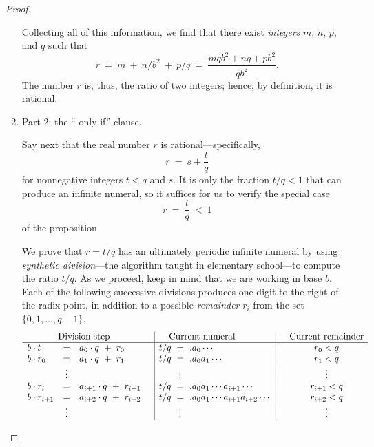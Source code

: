 \begin{proof}
\begin{enumerate}
Collecting all of this information, we find that there exist {\em
  integers} $m$, $n$, $p$, and $q$ such that
\[ r \ = \ m \ + \ n/ b^{2} \ + \ p/q \ = \
\frac{mqb^2 + nq + pb^2}{qb^2}. \]
The number $r$ is, thus, the ratio of two integers; hence, by
definition, it is rational.

\item 
{\small\sf Part 2: the `` only if'' clause.}

Say next that the real number $r$ is rational---specifically,
\[ r \ = \ s + \frac{t}{q} \]
for nonnegative integers $t < q$ and $s$.  It is only the fraction
$t/q < 1$ that can produce an infinite numeral, so it suffices for us
to verify the special case
\[ r \ = \ \frac{t}{q} \ < \ 1 \]
of the proposition.

We prove that $r = t/q$ has an ultimately periodic infinite numeral by
using \index{synthetic division} {\it synthetic division}---the
algorithm taught in elementary school---to compute the ratio $t/q$.
As we proceed, keep in mind that we are working in base $b$.  Each of
the following successive divisions produces one digit to the right of
the radix point, in addition to a possible {\it remainder} $r_i$ from
the set $\{0, 1, \ldots, q-1\}$.
\begin{equation}
\label{eq:build-rational-numeral}
\begin{array}{lclc|l|cc}
\multicolumn{3}{c}{\mbox{Division step}} & &  \hspace*{.15in} \mbox{Current numeral} & &
\mbox{Current remainder} \\
\hline
b \cdot t   & = & a_0 \cdot q \ + \ r_0 &
      & t/q \ = \ .a_0 \cdots &
      & r_0 < q \\
b \cdot r_0 & = & a_1 \cdot q \ + \ r_1 &
      & t/q \ = \ .a_0 a_1 \cdots &
      & r_1 < q \\
            & \vdots &  & & \hspace*{.3in} \vdots &  & \vdots \\
b \cdot r_i & = & a_{i+1} \cdot q \ + \ r_{i+1} &
      & t/q \ = \ .a_0 a_1 \cdots a_{i+1} \cdots &
      & r_{i+1} < q \\
b \cdot r_{i+1} & = & a_{i+2} \cdot q \ + \ r_{i+2} &
      & t/q \ = \ .a_0 a_1 \cdots a_{i+1} a_{i+2} \cdots &
      & r_{i+2} < q \\
            & \vdots &  & &  \hspace*{.3in}\vdots & & \vdots   \\
\end{array}
\end{equation}

\end{enumerate}
\end{proof}

